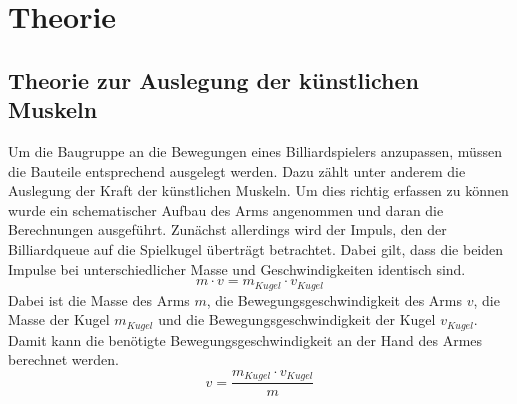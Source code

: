 \chapter{Theorie}
	\section{Theorie zur Auslegung der künstlichen Muskeln}
		Um die Baugruppe an die Bewegungen eines Billiardspielers anzupassen, müssen die Bauteile entsprechend ausgelegt werden. 
		Dazu zählt unter anderem die Auslegung der Kraft der künstlichen Muskeln. 
		Um dies richtig erfassen zu können wurde ein schematischer Aufbau des Arms angenommen und daran die Berechnungen ausgeführt. 
		Zunächst allerdings wird der Impuls, den der Billiardqueue auf die Spielkugel überträgt betrachtet. 
		Dabei gilt, dass die beiden Impulse bei unterschiedlicher Masse und Geschwindigkeiten identisch sind. 
		\begin{equation}
			m\cdot v = m_{Kugel} \cdot v_{Kugel}%
			\label{eq:ImpulsKugel}
		\end{equation}
		Dabei ist die Masse des Arms \(m\), die Bewegungsgeschwindigkeit des Arms \(v\), die Masse der Kugel \(m_{Kugel}\) und die Bewegungsgeschwindigkeit der Kugel \(v_{Kugel}\).
		Damit kann die benötigte Bewegungsgeschwindigkeit an der Hand des Armes berechnet werden.
		\begin{equation}
			v = \frac{m_{Kugel} \cdot v_{Kugel}}{m}%
			\label{eq:SollgeschwindikeitArm}
		\end{equation}

